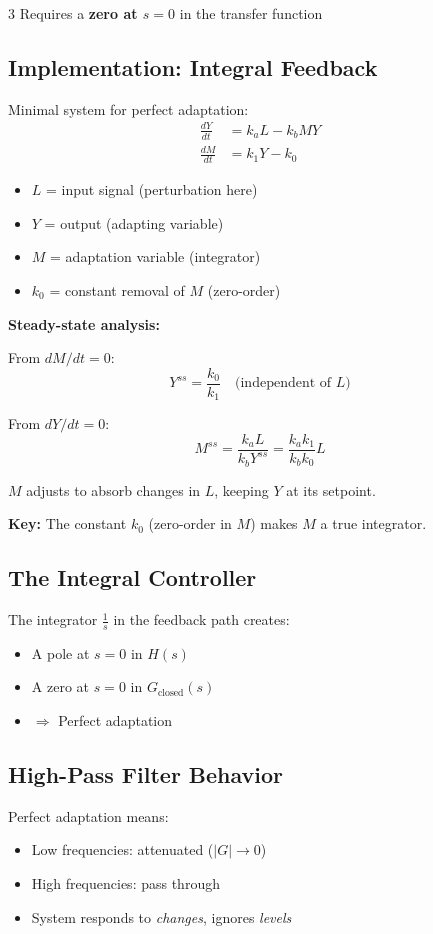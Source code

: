 \documentclass[10pt,landscape,letter]{article}
\begin{document}
\begin{multicols}{3}
{Requires a \textbf{zero at $s = 0$} in the transfer function
}

\subsection{Implementation: Integral Feedback}

Minimal system for perfect adaptation:
%
\begin{align*}
\frac{dY}{dt} &= k_a L - k_b M Y \\[4pt]
\frac{dM}{dt} &= k_1 Y - k_0
\end{align*}

\begin{itemize}
\item $L$ = input signal (perturbation here)
\item $Y$ = output (adapting variable)
\item $M$ = adaptation variable (integrator)
\item $k_0$ = constant removal of $M$ (zero-order)
\end{itemize}

\textbf{Steady-state analysis:}

From $dM/dt = 0$:
\begin{equation*}
Y^{ss} = \frac{k_0}{k_1} \quad \text{(independent of } L \text{)}
\end{equation*}

From $dY/dt = 0$:
\begin{equation*}
M^{ss} = \frac{k_a L}{k_b Y^{ss}} = \frac{k_a k_1}{k_b k_0} L
\end{equation*}

$M$ adjusts to absorb changes in $L$, keeping $Y$ at its setpoint.

\textbf{Key:} The constant $k_0$ (zero-order in $M$) makes $M$ a true integrator.

\subsection{The Integral Controller}
The integrator $\frac{1}{s}$ in the feedback path creates:
\begin{itemize}
\item A pole at $s=0$ in $H(s)$
\item A zero at $s=0$ in $G_{\text{closed}}(s)$
\item $\Rightarrow$ Perfect adaptation
\end{itemize}

\subsection{High-Pass Filter Behavior}
Perfect adaptation means:
\begin{itemize}
\item Low frequencies: attenuated ($|G| \to 0$)
\item High frequencies: pass through
\item System responds to \textit{changes}, ignores \textit{levels}
\end{itemize}


\end{multicols}
\end{document}
